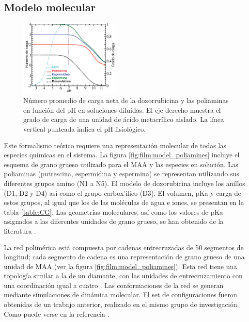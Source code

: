 

\subsection{Modelo molecular}
\label{sub:film:modelo-molecular}


\begin{figure}[ht]
	\centering
	\includegraphics[width=0.45\textwidth]{Figures/graph-film/chargeAds.pdf}
	\caption{N\'umero promedio de carga neta de la doxorrubicina y las poliaminas en funci\'on del pH en soluciones diluidas.
		El eje derecho muestra el grado de carga de una unidad de \'acido metacr\'ilico aislado. La l\'inea vertical punteada indica el pH fisiol\'ogico.}
	\label{fig:film:model}
\end{figure}


Este formalismo te\'orico requiere una representaci\'on molecular de todas las especies qu\'imicas en el sistema. La figura \ref{fig:film:model_poliamines} incluye el esquema de grano grueso utilizado para el MAA y las especies en soluci\'on. Las poliaminas (putrescina, espermidina y espermina) se representan utilizando sus diferentes grupos amino (N1 a N5). El modelo de doxorubicina incluye los anillos (D1, D2 y D4) as\'i como el grupo carbox'ilico (D3). El volumen, pKa y carga de estos grupos, al igual que los de las mol\'eculas de agua e iones, se presentan en la tabla \ref{table:CG}. Las geometr\'ias moleculares, as\'i como los valores de pKa asignados a las diferentes unidades de grano grueso, se han obtenido de la literatura \cite{agostinelli2010polyamines,casero2009recent,puchem}.

La red polim\'erica est\'a compuesta por cadenas entrecruzadas de 50 segmentos de longitud; cada segmento de cadena es una representaci\'on de grano grueso de una unidad de MAA (ver la figura \ref{fig:film:model_poliamines}). Esta red tiene una topolog\'ia similar a la de un diamante, con las unidades de entrecruzamiento con una coordinaci\'on igual a cuatro  \cite{Mann2005,QuesadaPerez2012M,Kosovan2015,Hofzumahaus2018}. Las conformaciones de la red se generan mediante simulaciones de din\'amica molecular. El set de configuraciones fueron obtenidas de un trabajo anterior, realizado en el mismo grupo de investigaci\'on. Como puede verse en la referencia  \cite{Hagemann2018}.



